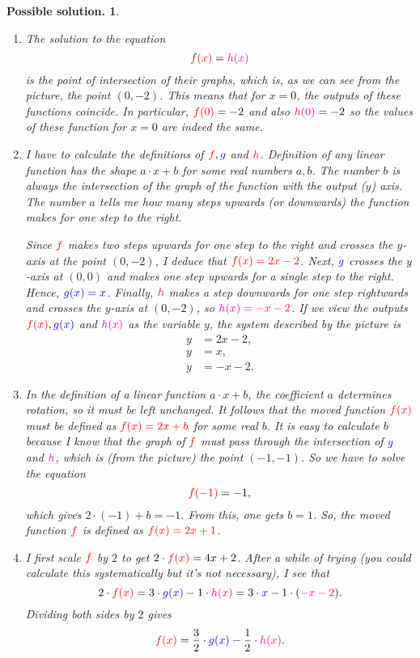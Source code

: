 \documentclass[a4paper,11pt]{article}
\newtheorem*{solution}{Possible solution.}
\newcommand{\tr}{\textcolor{red}}
\newcommand{\tb}{\textcolor{blue}}
\newcommand{\tm}{\textcolor{magenta}}
\begin{document}
\begin{solution}\hfill
 \begin{enumerate}[label=(\alph*),topsep=0pt]
  \item The solution to the equation
   \[
    \tr{f(x)} = \tm{h(x)}
   \]
   is the point of intersection of their graphs, which is, as we can see from
   the picture, the point $(0,-2)$. This means that for $x = 0$, the outputs of
   these functions coincide. In particular, $\tr{f(0)} = -2$ and also $\tm{h(0)}
   = -2$ so the values of these function for $x = 0$ are indeed the same.
  \item I have to calculate the definitions of $\tr{f}, \tb{g}$ and $\tm{h}$.
   Definition of any linear function has the shape $a \cdot x + b$ for some real
   numbers $a,b$. The number $b$ is always the intersection of the graph of the
   function with the output ($y$) axis. The number $a$ tells me how many steps
   upwards (or downwards) the function makes for one step to the right.

   Since $\tr{f}$ makes two steps upwards for one step to the right and crosses
   the $y$-axis at the point $(0,-2)$, I deduce that $\tr{f(x) = 2x - 2}$. Next,
   $\tb{g}$ crosses the $y$-axis at $(0,0)$ and makes one step upwards for a
   single step to the right. Hence, $\tb{g(x) = x}$. Finally, $\tm{h}$ makes a
   step downwards for one step rightwards and crosses the $y$-axis at $(0,-2)$,
   so $\tm{h(x) = -x - 2}$. If we view the outputs $\tr{f(x)},\tb{g(x)}$ and
   $\tm{h(x)}$ as the variable $y$, the system described by the picture is
   \begin{align*}
    y &= 2x - 2, \\
    y &= x, \\
    y &= -x - 2.
   \end{align*}
  \item In the definition of a linear function $a \cdot x + b$, the coefficient
   $a$ determines rotation, so it must be left unchanged. It follows that the
   moved function $\tr{f(x)}$ must be defined as $\tr{f(x) = 2x + b}$ for some
   real $b$. It is easy to calculate $b$ because I know that the graph of
   $\tr{f}$ must pass through the intersection of $\tb{g}$ and $\tm{h}$, which
   is (from the picture) the point $(-1,-1)$. So we have to solve the equation
   \[
    \tr{f(-1)} = -1,
   \]
   which gives $2 \cdot (-1) + b = -1$. From this, one gets $b = 1$. So, the
   moved function $\tr{f}$ is defined as $\tr{f(x) = 2x + 1}$.
  \item I first scale $\tr{f}$ by $2$ to get $2 \cdot \tr{f(x)} = 4x + 2$. After
   a while of trying (you could calculate this systematically but it's not
   necessary), I see that
   \[
    2 \cdot \tr{f(x)} = 3 \cdot \tb{g(x)} - 1 \cdot \tm{h(x)} = 3 \cdot \tb{x}
    -1 \cdot (\tm{-x-2}).
   \]
   Dividing both sides by $2$ gives
   \[
    \tr{f(x)} = \frac{3}{2} \cdot \tb{g(x)} -\frac{1}{2} \cdot \tm{h(x)}.
   \]
 \end{enumerate}
\end{solution}
\end{document}
